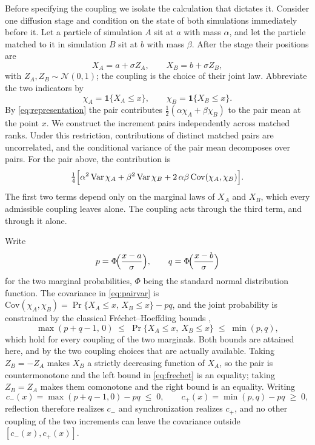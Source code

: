 \documentclass[smallextended,nospthms]{svjour3}
\theoremstyle{plain}
\theoremstyle{definition}
\theoremstyle{remark}
\numberwithin{equation}{section}
\newcommand{\Var}{\operatorname{Var}}
\newcommand{\ind}{\mathbf{1}}
\begin{document}
Before specifying the coupling we isolate the calculation that dictates it.
Consider one diffusion stage and condition on the state of both simulations
immediately before it. Let a particle of simulation $A$ sit at $a$ with mass
$\alpha$, and let the particle matched to it in simulation $B$ sit at $b$ with
mass $\beta$. After the stage their positions are
\[
 X_A=a+\sigma Z_A,\qquad X_B=b+\sigma Z_B,
\]
with $Z_A,Z_B\sim\mathcal N(0,1)$; the coupling is the choice of their joint
law. Abbreviate the two indicators by
\[
 \chi_A=\ind\{X_A\le x\},\qquad \chi_B=\ind\{X_B\le x\}.
\]
By \eqref{eq:representation} the pair contributes
$\tfrac12(\alpha\chi_A+\beta\chi_B)$ to the pair mean at the point $x$.
We construct the increment pairs independently across matched ranks. Under
this restriction, contributions of distinct matched pairs are uncorrelated,
and the conditional variance of the pair mean decomposes over pairs. For the
pair above, the contribution is
\begin{equation}
 \tfrac14\Bigl[\alpha^2\Var\chi_A+\beta^2\Var\chi_B
  +2\,\alpha\beta\,\mathrm{Cov}(\chi_A,\chi_B)\Bigr].
 \label{eq:pairvar}
\end{equation}
The first two terms depend only on the marginal laws of $X_A$ and $X_B$, which
every admissible coupling leaves alone. The coupling acts through the third
term, and through it alone.

Write
\[
 p=\Phi\!\Bigl(\frac{x-a}{\sigma}\Bigr),
 \qquad
 q=\Phi\!\Bigl(\frac{x-b}{\sigma}\Bigr)
\]
for the two marginal probabilities, $\Phi$ being the standard normal
distribution function. The covariance in \eqref{eq:pairvar} is
$\mathrm{Cov}(\chi_A,\chi_B)=\Pr\{X_A\le x,\,X_B\le x\}-pq$, and the joint
probability is constrained by
the classical Fréchet--Hoeffding bounds
\citep[Theorem~2.2.3 and Section~2.5]{nelsen2006},
\begin{equation}
 \max(p+q-1,\,0)\;\le\;\Pr\{X_A\le x,\ X_B\le x\}\;\le\;\min(p,q),
 \label{eq:frechet}
\end{equation}
which hold for every coupling of the two marginals. Both bounds are attained
here, and by the two coupling choices that are actually available. Taking
$Z_B=-Z_A$ makes $X_B$ a strictly decreasing function of $X_A$, so the pair is
countermonotone and the left bound in \eqref{eq:frechet} is an equality;
taking $Z_B=Z_A$ makes them comonotone and the right bound is an equality.
Writing
\begin{equation}
 c_-(x)=\max(p+q-1,0)-pq\;\le\;0,
 \qquad
 c_+(x)=\min(p,q)-pq\;\ge\;0,
 \label{eq:cpm}
\end{equation}
reflection therefore realizes $c_-$ and synchronization realizes $c_+$, and no
other coupling of the two increments can leave the covariance outside
$[c_-(x),c_+(x)]$.
\end{document}
